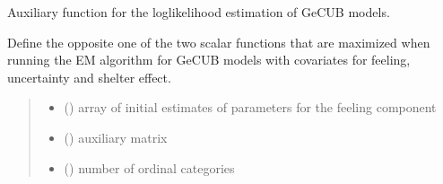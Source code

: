 \documentclass[letterpaper,10pt,english]{sphinxmanual}
\begin{document}
\begin{fulllineitems}
\label{\detokenize{cubmods:cubmods.cubsh_ywx.Q2}}
\pysigstartsignatures
{}
\pysigstopsignatures
\sphinxAtStartPar
Auxiliary function for the log\sphinxhyphen{}likelihood estimation of GeCUB models.

\sphinxAtStartPar
Define the opposite one of the two scalar functions that are maximized when running the E\sphinxhyphen{}M algorithm
for GeCUB models with covariates for feeling, uncertainty and shelter effect.
\begin{quote}\begin{description}
\begin{itemize}
\item {} 
\sphinxAtStartPar
{} () \textendash{} array of initial estimates of parameters for the feeling component

\item {} 
\sphinxAtStartPar
{} () \textendash{} auxiliary matrix

\item {} 
\sphinxAtStartPar
{} () \textendash{} number of ordinal categories

\end{itemize}

\end{description}\end{quote}

\end{fulllineitems}

\end{document}
